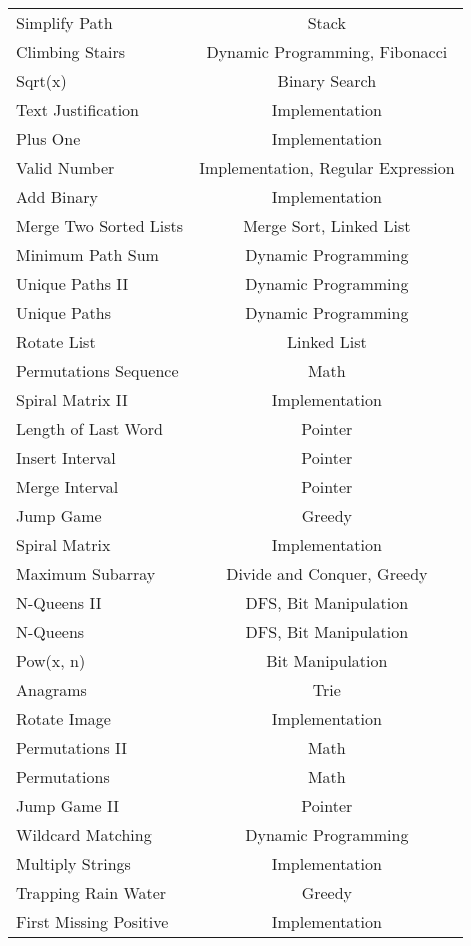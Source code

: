 \documentclass[paper=a4, fontsize=11pt]{scrartcl} %
\begin{document}
\begin{center}
\begin{longtable}{|l|c|}
    Simplify Path   &   Stack   \\
    Climbing Stairs &   Dynamic Programming, Fibonacci  \\
    Sqrt(x) &   Binary Search   \\
    Text Justification  &   Implementation  \\
    Plus One    &   Implementation  \\
    Valid Number    &   Implementation, Regular Expression   \\
    Add Binary  &   Implementation  \\
    Merge Two Sorted Lists  &   Merge Sort, Linked List \\
    Minimum Path Sum  & Dynamic Programming \\
    Unique Paths II & Dynamic Programming  \\
    Unique Paths & Dynamic Programming  \\
    Rotate List & Linked List \\
    Permutations Sequence & Math  \\
    Spiral Matrix II  & Implementation  \\
    Length of Last Word & Pointer \\
    Insert Interval & Pointer \\
    Merge Interval  & Pointer \\
    Jump Game & Greedy  \\
    Spiral Matrix & Implementation  \\
    Maximum Subarray    &   Divide and Conquer, Greedy  \\
    N-Queens II    &   DFS, Bit Manipulation \\
    N-Queens    &   DFS, Bit Manipulation \\
    Pow(x, n)   &   Bit Manipulation    \\
    Anagrams    &   Trie    \\
    Rotate Image    &   Implementation  \\
    Permutations II    &   Math    \\
    Permutations    &   Math    \\
    Jump Game II    &   Pointer\\
    Wildcard Matching   &   Dynamic Programming \\
    Multiply Strings    &   Implementation  \\
    Trapping Rain Water     &   Greedy  \\
    First Missing Positive  &   Implementation  \\

\end{longtable}
\end{center}
\end{document}
